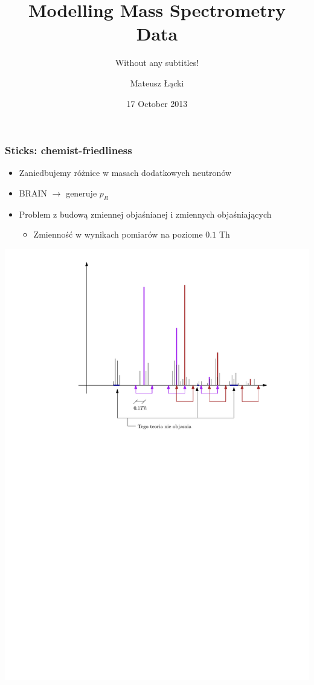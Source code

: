 \documentclass[xetex]{beamer}
\title[Mass Spectrometry]{Modelling Mass Spectrometry Data}
\subtitle{Without any subtitles!}
\date{17 October 2013}
\author[Matteo]{Mateusz Łącki}
\institute[UW]{Uniwersytet Warszawski}
\begin{document}



	\begin{frame}\frametitle{Sticks: chemist-friedliness}
		\begin{itemize}
			\item 	Zaniedbujemy różnice w masach dodatkowych neutronów
			\item 	BRAIN $\rightarrow$ generuje $p_R$
			\item 	Problem z budową zmiennej objaśnianej i zmiennych objaśniających
			\begin{itemize}
				\item 	Zmienność w wynikach pomiarów na poziome $0.1$ Th  	
			\end{itemize}
		\end{itemize}
	\end{frame}

	\begin{frame}[plain]
	    \begin{center}
	        \includegraphics[height=.9\textheight,keepaspectratio]{./picts/sticks}
	    \end{center}
	\end{frame}
\end{document}
